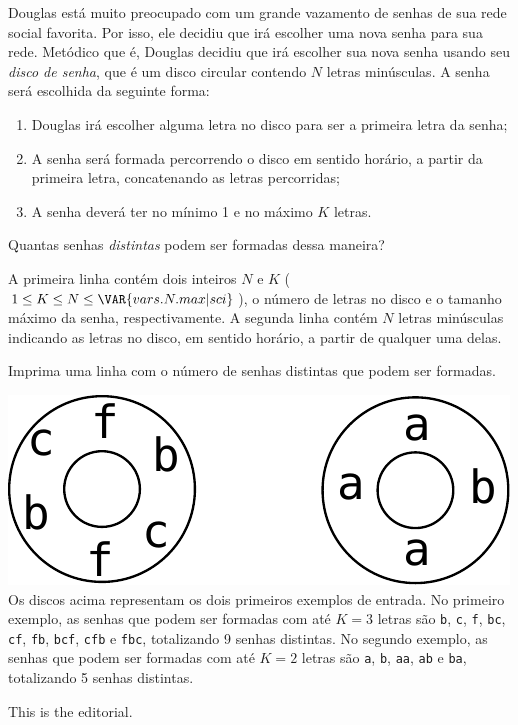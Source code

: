 Douglas está muito preocupado com um grande vazamento de senhas de sua rede
social favorita. Por isso, ele
decidiu que irá escolher uma nova senha para sua rede.
Metódico que é, Douglas decidiu que irá escolher sua nova senha usando seu
\textit{disco de senha}, que é um disco circular contendo $N$ letras minúsculas.
A senha será escolhida da seguinte forma:
\begin{enumerate}
    \item Douglas irá escolher alguma letra no disco para ser a primeira letra
    da senha;
    \item A senha será formada percorrendo o disco em sentido horário, a partir
    da primeira letra, concatenando as letras percorridas;
    \item A senha deverá ter no mínimo 1 e no máximo $K$ letras.
\end{enumerate}

Quantas senhas \textit{distintas} podem ser formadas dessa maneira?


A primeira linha contém dois inteiros $N$ e $K$ ($1 \leq K \leq N \leq
        \VAR{vars.N.max | sci}$), o número de letras no disco e o tamanho máximo
da senha, respectivamente.
A segunda linha contém $N$ letras minúsculas indicando as letras no disco, em
sentido horário, a partir de qualquer uma delas.

Imprima uma linha com o número de senhas distintas que podem ser formadas.

\includegraphics[scale=0.6]{disco0.pdf}\\
Os discos acima representam os dois primeiros exemplos de entrada.
No primeiro exemplo, as senhas que podem ser formadas com até $K=3$ letras são
\texttt{b}, \texttt{c}, \texttt{f}, \texttt{bc}, \texttt{cf}, \texttt{fb},
\texttt{bcf}, \texttt{cfb} e \texttt{fbc}, totalizando 9 senhas distintas.
No segundo exemplo, as senhas que podem ser formadas com até $K=2$ letras são
\texttt{a}, \texttt{b}, \texttt{aa}, \texttt{ab} e \texttt{ba}, totalizando 5 senhas distintas.


This is the editorial.
